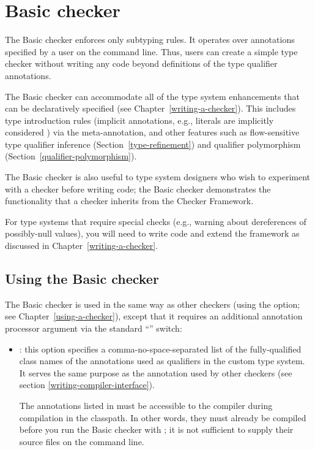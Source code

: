 \htmlhr
\chapter{Basic checker\label{basic-checker}}

The Basic checker enforces only subtyping rules.  It operates over
annotations specified by a user on the command line.  Thus, users can
create a simple type checker without writing any code beyond definitions of
the type qualifier annotations.

The Basic checker can accommodate all of the type system enhancements that
can be declaratively specified (see Chapter~\ref{writing-a-checker}).
This includes type introduction rules (implicit
annotations, e.g., literals are implicitly considered ) via
the  meta-annotation, and other features such as
flow-sensitive type qualifier inference (Section~\ref{type-refinement}) and
qualifier polymorphism (Section~\ref{qualifier-polymorphism}).

The Basic checker is also useful to type system designers who wish to
experiment with a checker before writing code; the Basic checker
demonstrates the functionality that a checker inherits from the Checker
Framework.

For type systems that require special checks (e.g., warning about
dereferences of possibly-null values), you will need to write code and
extend the framework as discussed in Chapter~\ref{writing-a-checker}.


\section{Using the Basic checker\label{basic-using}}

The Basic checker is used in the same way as other checkers (using the
 option; see Chapter~\ref{using-a-checker}), except that it
requires an additional annotation processor argument via the standard
``'' switch:

\begin{itemize}

\item
{}: this option specifies a comma-no-space-separated list of
the fully-qualified class
names of the annotations used as qualifiers in the custom type system.
%
It serves the same purpose as the 
annotation used by other checkers (see section
\ref{writing-compiler-interface}).

The annotations listed in  must be accessible to
the compiler during compilation in the classpath.  In other words, they must
already be compiled before you run the Basic checker with ; it
is not sufficient to supply their source files on the command line.

\end{itemize}

